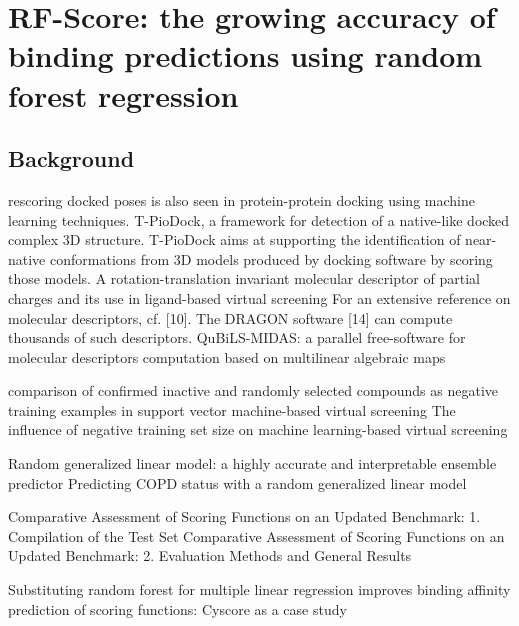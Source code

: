\chapter{RF-Score: the growing accuracy of binding predictions using random forest regression}

\section{Background}

\citep{1399} rescoring docked poses is also seen in protein-protein docking using machine learning techniques. T-PioDock, a framework for detection of a native-like docked complex 3D structure. T-PioDock aims at supporting the identification of near-native conformations from 3D models produced by docking software by scoring those models.
\citep{1389} A rotation-translation invariant molecular descriptor of partial charges and its use in ligand-based virtual screening
\citep{1389} For an extensive reference on molecular descriptors, cf. [10]. The DRAGON software [14] can compute thousands of such descriptors.
\citep{1400} QuBiLS-MIDAS: a parallel free-software for molecular descriptors computation based on multilinear algebraic maps

\citep{1423} comparison of confirmed inactive and randomly selected compounds as negative training examples in support vector machine-based virtual screening
\citep{1404} The influence of negative training set size on machine learning-based virtual screening

\citep{1377} Random generalized linear model: a highly accurate and interpretable ensemble predictor
\citep{1418} Predicting COPD status with a random generalized linear model

\citep{1426} Comparative Assessment of Scoring Functions on an Updated Benchmark: 1. Compilation of the Test Set
\citep{1411} Comparative Assessment of Scoring Functions on an Updated Benchmark: 2. Evaluation Methods and General Results

\citep{1432} Substituting random forest for multiple linear regression improves binding affinity prediction of scoring functions: Cyscore as a case study

\chapterend
